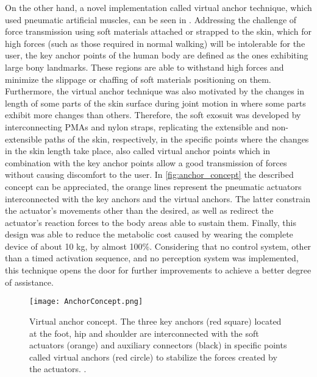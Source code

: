 On the other hand, a novel implementation called virtual anchor technique, which used pneumatic artificial muscles, can be seen in \cite{wehner2013lightweight}. Addressing the challenge of force transmission using soft materials attached or strapped to the skin, which for high forces (such as those required in normal walking) will be intolerable for the user, the key anchor points of the human body are defined as the ones exhibiting large bony landmarks. These regions are able to withstand high forces and minimize the slippage or chaffing of soft materials positioning on them. Furthermore, the virtual anchor technique was also motivated by the changes in length of some parts of the skin surface during joint motion in where some parts exhibit more changes than others. Therefore, the soft exosuit was developed by interconnecting PMAs and nylon straps, replicating the extensible and non-extensible paths of the skin, respectively, in the specific points where the changes in the skin length take place, also called virtual anchor points which in combination with the key anchor points allow a good transmission of forces without causing discomfort to the user. In \autoref{fig:anchor_concept} the described concept can be appreciated, the orange lines represent the pneumatic actuators interconnected with the key anchors and the virtual anchors. The latter constrain the actuator's movements other than the desired, as well as redirect the actuator's reaction forces to the body areas able to sustain them. Finally, this design was able to reduce the metabolic cost caused by wearing the complete device of about 10 kg, by almost 100\%. Considering that no control system, other than a timed activation sequence, and no perception system was implemented, this technique opens the door for further improvements to achieve a better degree of assistance.

\begin{figure}[hbtp!]
    \centering
    \texttt{[image: AnchorConcept.png]}
    \caption{Virtual anchor concept. The three key anchors (red square) located at the foot, hip and shoulder are interconnected with the soft actuators (orange) and auxiliary connectors (black) in specific points called virtual anchors (red circle) to stabilize the forces created by the actuators. \cite{wehner2013lightweight}. }
    \label{fig:anchor_concept}
\end{figure}

